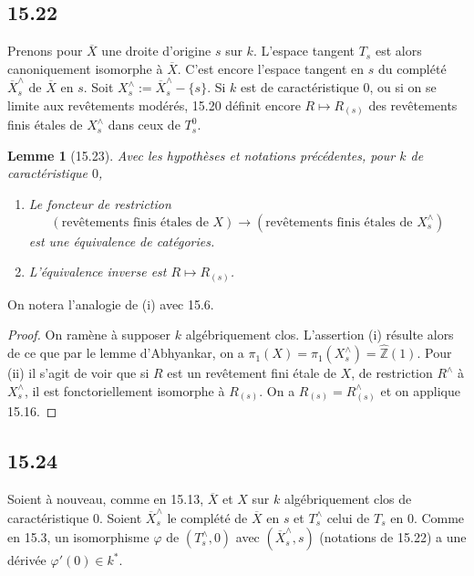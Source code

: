 \documentclass[12pt,a4paper]{article}
\theoremstyle{plain}
\newtheorem{lemma}[theorem]{Lemme}
\theoremstyle{definition}
\theoremstyle{remark}
\newcommand{\bZ}{\mathbb{Z}}
\begin{document}
\subsection*{15.22}

Prenons pour $\overline{X}$ une droite d'origine $s$ sur $k$. L'espace tangent $T_s$ est alors canoniquement isomorphe à $\overline{X}$. C'est encore l'espace tangent en $s$ du complété $\overline{X}_s^\wedge$ de $\overline{X}$ en $s$. Soit $X_s^\wedge := \overline{X}_s^\wedge - \{s\}$. Si $k$ est de caractéristique $0$, ou si on se limite aux revêtements modérés, 15.20 définit encore $R \mapsto R_{(s)}$ des revêtements finis étales de $X_s^\wedge$ dans ceux de $T_s^0$.

\begin{lemma}[15.23]
Avec les hypothèses et notations précédentes, pour $k$ de caractéristique $0$,
\begin{enumerate}[label=(\roman*), nosep]
\item Le foncteur de restriction
\[
(\text{revêtements finis étales de } X) \to (\text{revêtements finis étales de } X_s^\wedge)
\]
est une équivalence de catégories.
\item L'équivalence inverse est $R \mapsto R_{(s)}$.
\end{enumerate}
\end{lemma}

On notera l'analogie de (i) avec 15.6.

\begin{proof}
On ramène à supposer $k$ algébriquement clos. L'assertion (i) résulte alors de ce que par le lemme d'Abhyankar, on a $\pi_1(X) = \pi_1(X_s^\wedge) = \hat{\bZ}(1)$. Pour (ii) il s'agit de voir que si $R$ est un revêtement fini étale de $X$, de restriction $R^\wedge$ à $X_s^\wedge$, il est fonctoriellement isomorphe à $R_{(s)}$. On a $R_{(s)} = R^\wedge_{(s)}$ et on applique 15.16.
\end{proof}

\subsection*{15.24}

Soient à nouveau, comme en 15.13, $\overline{X}$ et $X$ sur $k$ algébriquement clos de caractéristique $0$. Soient $\overline{X}_s^\wedge$ le complété de $\overline{X}$ en $s$ et $T_s^\wedge$ celui de $T_s$ en $0$. Comme en 15.3, un isomorphisme $\varphi$ de $(T_s^\wedge, 0)$ avec $(\overline{X}_s^\wedge, s)$ (notations de 15.22) a une dérivée $\varphi'(0) \in k^*$.
\end{document}
